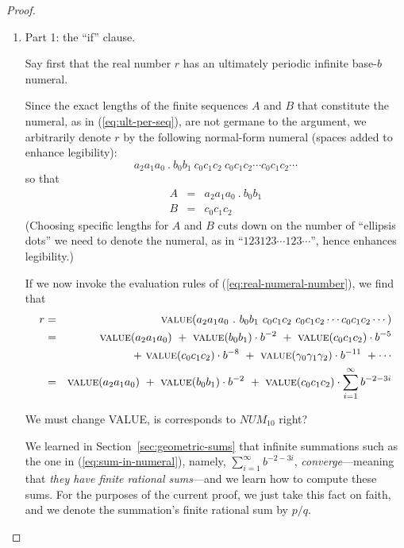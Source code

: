 \begin{proof}

\begin{enumerate}
\item 
{\small\sf Part 1: the ``if'' clause.}

Say first that the real number $r$ has an ultimately periodic infinite
base-$b$ numeral.

Since the exact lengths of the finite sequences $A$ and $B$ that
constitute the numeral, as in (\ref{eq:ult-per-seq}), are not germane
to the argument, we arbitrarily denote $r$ by the following
normal-form numeral (spaces added to enhance legibility):
\[  a_2 a_1 a_0 \ . \ b_0 b_1 \
c_0 c_1 c_2 \
c_0 c_1 c_2
\cdots
c_0 c_1 c_2
\cdots
\]
so that
\begin{eqnarray*}
A & = & a_2 a_1 a_0 \ . \ b_0 b_1 \\
B & = & c_0 c_1 c_2
\end{eqnarray*}
(Choosing specific lengths for $A$ and $B$ cuts down on the number of
``ellipsis dots'' we need to denote the numeral, as in ``$123 123
\cdots 123 \cdots$'', hence enhances legibility.)

If we now invoke the evaluation rules of (\ref{eq:real-numeral-number}),
we find that
\begin{eqnarray}
\nonumber
r & = &
\mbox{\sc value}(a_2 a_1 a_0 \ . \ b_0 b_1 \
c_0 c_1 c_2 \
c_0 c_1 c_2
\cdots
c_0 c_1 c_2
\cdots) \\
\nonumber
  & = &
\mbox{\sc value}(a_2 a_1 a_0)
 \ + \ \mbox{\sc value}(b_0 b_1) \cdot b^{-2}
 \ + \
\mbox{\sc value}(c_0 c_1 c_2) \cdot b^{-5} \\
\label{eq:sum-in-numeral}
  &  &
 \ + \
\mbox{\sc value}(c_0 c_1 c_2) \cdot b^{-8}
 \ + \
\mbox{\sc value}(\gamma_0 \gamma_1 \gamma_2) \cdot b^{-11}
\ + \cdots \\
\nonumber
  & = &
\mbox{\sc value}(a_2 a_1 a_0)
 \ + \ \mbox{\sc value}(b_0 b_1) \cdot b^{-2}
 \ + \
\mbox{\sc value}(c_0 c_1 c_2) \cdot \sum_{i=1}^\infty b^{-2-3i}
\end{eqnarray}

{\Denis We must change VALUE, is corresponds to $NUM_{10}$ right?}

We learned in Section~\ref{sec:geometric-sums} that infinite
summations such as the one in (\ref{eq:sum-in-numeral}), namely,
$\sum_{i=1}^\infty b^{-2-3i}$, {\em converge}---meaning that {\em they
  have finite rational sums}---and we learn how to compute these sums.
For the purposes of the current proof, we just take this fact on
faith, and we denote the summation's finite rational sum by $p/q$.


\end{enumerate}
\end{proof}
